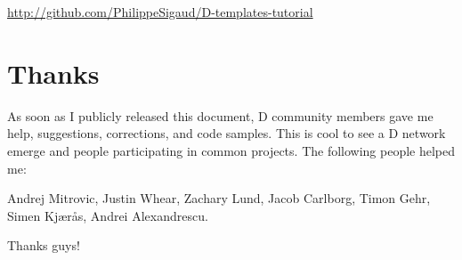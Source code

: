 \vspace{8pt}
\url{http://github.com/PhilippeSigaud/D-templates-tutorial}

\section*{Thanks}\label{thanks}

As soon as I publicly released this document, D community members gave me help, suggestions, corrections, and code samples. This is cool to see a D network emerge and people participating in common projects. The following people helped me:

Andrej Mitrovic, Justin Whear, Zachary Lund, Jacob Carlborg, Timon Gehr, Simen Kj\ae r\r{a}s, Andrei Alexandrescu.

\vspace{8pt}
Thanks guys! 
